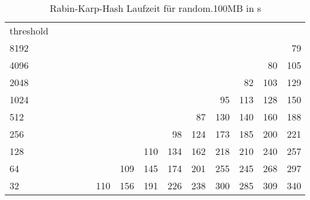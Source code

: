 \begin{table}[h]
	\caption{Rabin-Karp-Hash Laufzeit für random.100MB in s}
	\label{tab:my-table}
	\begin{tabular}{lrrrrrrrrrrrrr}
		\multicolumn{1}{r}{threshold} &  &  &  &  &  &  &  &  &  &  &  &  &  \\ \cline{1-1}
		\multicolumn{1}{|l|}{8192} &  &  &  &  &  &  &  &  &  &  &  &  & \cellcolor[HTML]{99E600}79 \\ \cline{1-1}
		\multicolumn{1}{|l|}{4096} &  &  &  &  &  &  &  &  &  &  &  & \cellcolor[HTML]{99E600}80 & \cellcolor[HTML]{99E600}105 \\ \cline{1-1}
		\multicolumn{1}{|l|}{2048} &  &  &  &  &  &  &  &  &  &  & \cellcolor[HTML]{99E600}82 & \cellcolor[HTML]{99E600}103 & \cellcolor[HTML]{99E600}129 \\ \cline{1-1}
		\multicolumn{1}{|l|}{1024} &  &  &  &  &  &  &  &  &  & \cellcolor[HTML]{99E600}95 & \cellcolor[HTML]{99E600}113 & \cellcolor[HTML]{99E600}128 & \cellcolor[HTML]{99E600}150 \\ \cline{1-1}
		\multicolumn{1}{|l|}{512} &  &  &  &  &  &  &  &  & \cellcolor[HTML]{99E600}87 & \cellcolor[HTML]{99E600}130 & \cellcolor[HTML]{99E600}140 & \cellcolor[HTML]{99E600}160 & \cellcolor[HTML]{99E600}188 \\ \cline{1-1}
		\multicolumn{1}{|l|}{256} &  &  &  &  &  &  &  & \cellcolor[HTML]{99E600}98 & \cellcolor[HTML]{99E600}124 & \cellcolor[HTML]{99E600}173 & \cellcolor[HTML]{99E600}185 & \cellcolor[HTML]{99E600}200 & \cellcolor[HTML]{E69900}221 \\ \cline{1-1}
		\multicolumn{1}{|l|}{128} &  &  &  &  &  &  & \cellcolor[HTML]{99E600}110 & \cellcolor[HTML]{99E600}134 & \cellcolor[HTML]{99E600}162 & \cellcolor[HTML]{E69900}218 & \cellcolor[HTML]{E69900}210 & \cellcolor[HTML]{E69900}240 & \cellcolor[HTML]{E69900}257 \\ \cline{1-1}
		\multicolumn{1}{|l|}{64} &  &  &  &  &  & \cellcolor[HTML]{99E600}109 & \cellcolor[HTML]{99E600}145 & \cellcolor[HTML]{99E600}174 & \cellcolor[HTML]{99E600}201 & \cellcolor[HTML]{E69900}255 & \cellcolor[HTML]{E69900}245 & \cellcolor[HTML]{E69900}268 & \cellcolor[HTML]{E69900}297 \\ \cline{1-1}
		\multicolumn{1}{|l|}{32} &  &  &  &  & \cellcolor[HTML]{99E600}110 & \cellcolor[HTML]{99E600}156 & \cellcolor[HTML]{99E600}191 & \cellcolor[HTML]{E69900}226 & \cellcolor[HTML]{E69900}238 & \cellcolor[HTML]{E69900}300 & \cellcolor[HTML]{E69900}285 & \cellcolor[HTML]{E69900}309 & \cellcolor[HTML]{E69900}340 \\ \cline{1-1}

\end{tabular}
\end{table}
